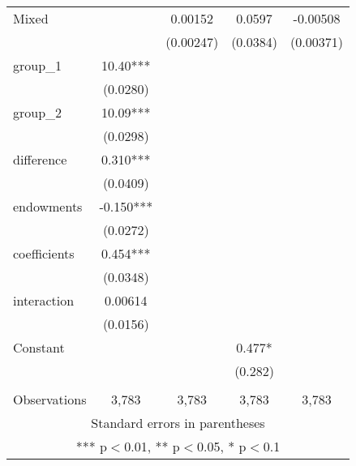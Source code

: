 \documentclass[]{article}
\begin{document}
\begin{tabular}{lcccc}
Mixed &  & 0.00152 & 0.0597 & -0.00508 \\
 &  & (0.00247) & (0.0384) & (0.00371) \\
group\_1 & 10.40*** &  &  &  \\
 & (0.0280) &  &  &  \\
group\_2 & 10.09*** &  &  &  \\
 & (0.0298) &  &  &  \\
difference & 0.310*** &  &  &  \\
 & (0.0409) &  &  &  \\
endowments & -0.150*** &  &  &  \\
 & (0.0272) &  &  &  \\
coefficients & 0.454*** &  &  &  \\
 & (0.0348) &  &  &  \\
interaction & 0.00614 &  &  &  \\
 & (0.0156) &  &  &  \\
Constant &  &  & 0.477* &  \\
 &  &  & (0.282) &  \\
 &  &  &  &  \\
 Observations & 3,783 & 3,783 & 3,783 & 3,783 \\ \hline
\multicolumn{5}{c}{ Standard errors in parentheses} \\
\multicolumn{5}{c}{ *** p$<$0.01, ** p$<$0.05, * p$<$0.1} \\
\end{tabular}
\end{document}
